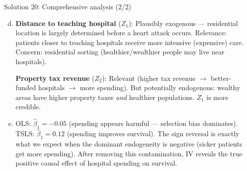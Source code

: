 \documentclass[10pt]{beamer}
\begin{document}
\begin{frame}{Solution 20: Comprehensive analysis (2/2)}
\label{s20b}
\begin{enumerate}[(a)]
  \setcounter{enumi}{3}
  \item \textbf{Distance to teaching hospital} ($Z_1$): Plausibly exogenous --- residential location is largely determined before a heart attack occurs. Relevance: patients closer to teaching hospitals receive more intensive (expensive) care. Concern: residential sorting (healthier/wealthier people may live near hospitals).

  \textbf{Property tax revenue} ($Z_2$): Relevant (higher tax revenue $\to$ better-funded hospitals $\to$ more spending). But potentially endogenous: wealthy areas have higher property taxes \emph{and} healthier populations. \alert{$Z_1$ is more credible.}

  \item OLS: $\widehat{\beta}_1 = -0.05$ (spending appears harmful --- selection bias dominates). TSLS: $\widehat{\beta}_1 = 0.12$ (spending improves survival). The sign reversal is exactly what we expect when the dominant endogeneity is negative (sicker patients get more spending). After removing this contamination, IV reveals the \alert{true positive causal effect} of hospital spending on survival.
\end{enumerate}

\vfill
\hfill\hyperlink{q20}{}
\end{frame}
\end{document}
